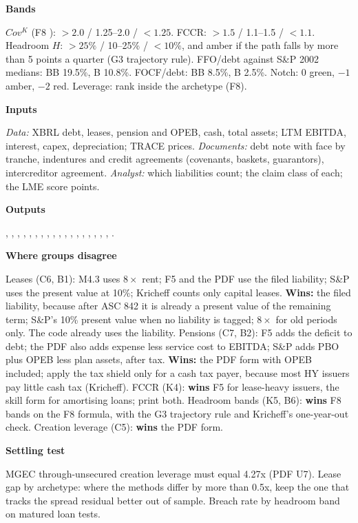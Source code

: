 \documentclass[11pt]{article}
\newcommand{\fld}[1]{\par\medskip\noindent\textbf{\textcolor{steel}{#1}}\par\nopagebreak}
\begin{document}
\fld{Bands} $Cov^K$ (F8 ): $>2.0$ / 1.25--2.0 / $<1.25$. FCCR: $>1.5$ / 1.1--1.5 / $<1.1$. Headroom $H$: $>25\%$ / 10--25\% / $<10\%$, and amber if the path falls by more than 5 points a quarter (G3 trajectory rule). FFO/debt against S\&P 2002 medians: BB 19.5\%, B 10.8\%. FOCF/debt: BB 8.5\%, B 2.5\%. Notch: 0 green, $-1$ amber, $-2$ red. Leverage: rank inside the archetype (F8).

\fld{Inputs} \emph{Data:} XBRL debt, leases, pension and OPEB, cash, total assets; LTM EBITDA, interest, capex, depreciation; TRACE prices. \emph{Documents:} debt note with face by tranche, indentures and credit agreements (covenants, baskets, guarantors), intercreditor agreement. \emph{Analyst:} which liabilities count; the claim class of each; the LME score points.

\fld{Outputs} , , , , , , , , , , , , , , , , , , .

\fld{Where groups disagree}
Leases (C6, B1): M4.3 uses $8\times$ rent; F5 and the PDF use the filed liability; S\&P uses the present value at 10\%; Kricheff counts only capital leases. \textbf{Wins:} the filed liability, because after ASC 842 it is already a present value of the remaining term; S\&P's 10\% present value when no liability is tagged; $8\times$ for old periods only. The code already uses the liability.
Pensions (C7, B2): F5 adds the deficit to debt; the PDF also adds expense less service cost to EBITDA; S\&P adds PBO plus OPEB less plan assets, after tax. \textbf{Wins:} the PDF form with OPEB included; apply the tax shield only for a cash tax payer, because most HY issuers pay little cash tax (Kricheff).
FCCR (K4): \textbf{wins} F5 for lease-heavy issuers, the skill form for amortising loans; print both.
Headroom bands (K5, B6): \textbf{wins} F8 bands on the F8 formula, with the G3 trajectory rule and Kricheff's one-year-out check.
Creation leverage (C5): \textbf{wins} the PDF form.

\fld{Settling test} MGEC through-unsecured creation leverage must equal 4.27x (PDF U7). Lease gap by archetype: where the methods differ by more than 0.5x, keep the one that tracks the spread residual better out of sample. Breach rate by headroom band on matured loan tests.
\end{document}
